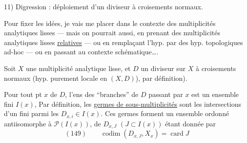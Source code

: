 11) Digression : déploiement d'un diviseur à croisements normaux.

Pour fixer les idées, je vais me placer dans le contexte des multiplicités analytiques lisses — mais on pourrait aussi, en prenant des multiplicités analytiques lisses \uline{relatives} — ou en remplaçant l'hyp.  par des hyp. topologiques ad-hoc — ou en passant au contexte schématique\ldots.

Soit $X$ une multiplicité analytique lisse, et $D$ un diviseur sur $X$ à croisements normaux (hyp. purement locale en $(X,D)$), par définition). 

Pour tout pt $x$ de $D$, l'ens des ``branches'' de $D$ passant par $x$ est un ensemble fini $I(x)$, Par définition, les \uline{germes  de sous-multiplicités}   sont les intersections d'un  fini  parmi les $D_{x,i}\in I(x)$.
Ces germes forment un ensemble ordonné  antiisomorphe à $\mathcal P(I(x))$,   de $D_{x,J}$ $(J\subset I(x))$ étant donnée par
\[
(149)\qquad \operatorname{codim}(D_{x,J},X_x)=\operatorname{card}J
\]
